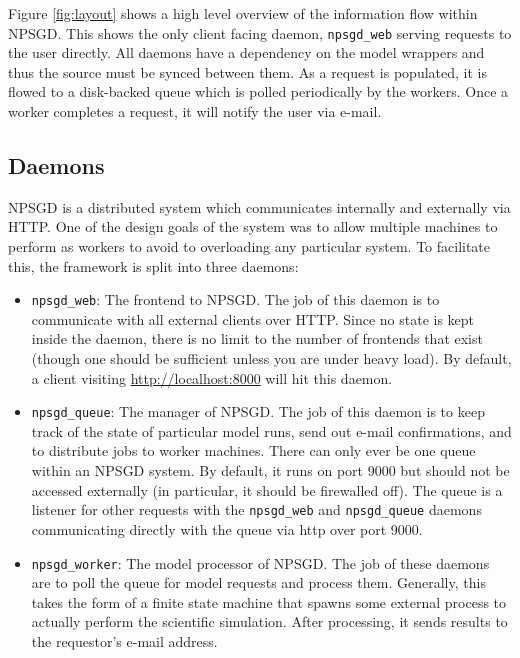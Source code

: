 \documentclass{article}
\begin{document}
Figure \ref{fig:layout} shows a high level overview of the information flow
within NPSGD. This shows the only client facing daemon, \texttt{npsgd\_web}
serving requests to the user directly. All daemons have a dependency on the
model wrappers and thus the source must be synced between them. As a request is
populated, it is flowed to a disk-backed queue which is polled periodically by
the workers. Once a worker completes a request, it will notify the user via
e-mail.

\subsection{Daemons}
NPSGD is a distributed system which communicates internally and externally via
HTTP. One of the design goals of the system was to allow multiple machines to
perform as workers to avoid to overloading any particular system. To
facilitate this, the framework is split into three daemons:
\begin{itemize}
    \item \texttt{npsgd\_web}: The frontend to NPSGD. The job of this daemon is
    to communicate with all external clients over HTTP. Since no state is kept
    inside the daemon, there is no limit to the number of frontends that exist (though one
    should be sufficient unless you are under heavy load). By default, a
    client visiting \url{http://localhost:8000} will hit this daemon.

    \item \texttt{npsgd\_queue}: The manager of NPSGD. The job of this daemon is
    to keep track of the state of particular model runs, send out e-mail
    confirmations, and to distribute jobs to worker machines. There can only
    ever be one queue within an NPSGD system. By default, it runs on port 9000
    but should not be accessed externally (in particular, it should be
    firewalled off). The queue is a listener for other requests with the 
    \texttt{npsgd\_web} and \texttt{npsgd\_queue} daemons communicating directly
    with the queue via http over port 9000.

    \item \texttt{npsgd\_worker}: The model processor of NPSGD. The job of these
    daemons are to poll the queue for model requests and process them.
    Generally, this takes the form of a finite state machine that spawns some
    external process to actually perform the scientific simulation. After
    processing, it sends results to the requestor's e-mail address.
\end{itemize}
\end{document}
